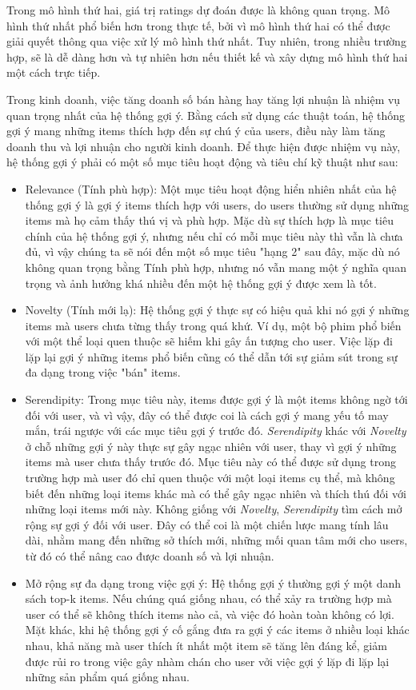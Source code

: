 \documentclass[14pt]{article}
\begin{document}
	Trong mô hình thứ hai, giá trị ratings dự đoán được là không quan trọng. Mô hình thứ nhất phổ biến hơn trong thực tế, bởi vì mô hình thứ hai có thể được giải quyết thông qua việc xử lý mô hình thứ nhất. Tuy nhiên, trong nhiều trường hợp, sẽ là dễ dàng hơn và tự nhiên hơn nếu thiết kế và xây dựng mô hình thứ hai một cách trực tiếp.
	
	Trong kinh doanh, việc tăng doanh số bán hàng hay tăng lợi nhuận là nhiệm vụ quan trọng nhất của hệ thống gợi ý. Bằng cách sử dụng các thuật toán, hệ thống gợi ý mang những items thích hợp đến sự chú ý của users, điều này làm tăng doanh thu và lợi nhuận cho người kinh doanh. Để thực hiện được nhiệm vụ này, hệ thống gợi ý phải có một số mục tiêu hoạt động và tiêu chí kỹ thuật như sau:
	
	\begin{itemize}
		\item Relevance (Tính phù hợp): Một mục tiêu hoạt động hiển nhiên nhất của hệ thống gợi ý là gợi ý items thích hợp với users, do users thường sử dụng những items mà họ cảm thấy thú vị và phù hợp. Mặc dù sự thích hợp là mục tiêu chính của hệ thống gợi ý, nhưng nếu chỉ có mỗi mục tiêu này thì vẫn là chưa đủ, vì vậy chúng ta sẽ nói đến một số mục tiêu "hạng 2" sau đây, mặc dù nó không quan trọng bằng Tính phù hợp, nhưng nó vẫn mang một ý nghĩa quan trọng và ảnh hưởng khá nhiều đến một hệ thống gợi ý được xem là tốt.
		\item Novelty (Tính mới lạ): Hệ thống gợi ý thực sự có hiệu quả khi nó gợi ý những items mà users chưa từng thấy trong quá khứ. Ví dụ, một bộ phim phổ biến với một thể loại quen thuộc sẽ hiếm khi gây ấn tượng cho user. Việc lặp đi lặp lại gợi ý những items phổ biến cũng có thể dẫn tới sự giảm sút trong sự đa dạng trong việc "bán" items.
		\item Serendipity: Trong mục tiêu này, items được gợi ý là một items không ngờ tới đối với user, và vì vậy, đây có thể được coi là cách gợi ý mang yếu tố may mắn, trái ngược với các mục tiêu gợi ý trước đó. \textit{Serendipity} khác với \textit{Novelty} ở chỗ những gợi ý này thực sự gây ngạc nhiên với user, thay vì gợi ý những items mà user chưa thấy trước đó. Mục tiêu này có thể được sử dụng trong trường hợp mà user đó chỉ quen thuộc với một loại items cụ thể, mà không biết đến những loại items khác mà có thể gây ngạc nhiên và thích thú đối với những loại items mới này. Không giống với \textit{Novelty}, \textit{Serendipity} tìm cách mở rộng sự gợi ý đối với user. Đây có thể coi là một chiến lược mang tính lâu dài, nhằm mang đến những sở thích mới, những mối quan tâm mới cho users, từ đó có thể nâng cao được doanh số và lợi nhuận.
		\item Mở rộng sự đa dạng trong việc gợi ý: Hệ thống gợi ý thường gợi ý một danh sách top-k items. Nếu chúng quá giống nhau, có thể xảy ra trường hợp mà user có thể sẽ không thích items nào cả, và việc đó hoàn toàn không có lợi. Mặt khác, khi hệ thống gợi ý cố gắng đưa ra gợi ý các items ở nhiều loại khác nhau, khả năng mà user thích ít nhất một item sẽ tăng lên đáng kể, giảm được rủi ro trong việc gây nhàm chán cho user vởi việc gợi ý lặp đi lặp lại những sản phẩm quá giống nhau.
	\end{itemize}
	
\end{document}
